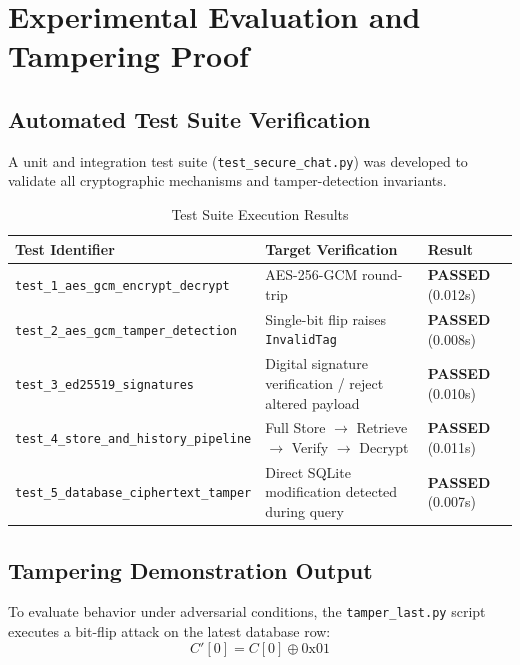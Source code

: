 \documentclass[11pt,a4paper]{article}
\begin{document}
\section{Experimental Evaluation and Tampering Proof}

\subsection{Automated Test Suite Verification}
A unit and integration test suite (\texttt{test\_secure\_chat.py}) was developed to validate all cryptographic mechanisms and tamper-detection invariants.

\begin{table}[htbp]
\centering
\small
\begin{tabular}{@{}lll@{}}
\toprule
\textbf{Test Identifier} & \textbf{Target Verification} & \textbf{Result} \\
\midrule
\texttt{test\_1\_aes\_gcm\_encrypt\_decrypt} & AES-256-GCM round-trip & \textbf{PASSED} (0.012s) \\
\texttt{test\_2\_aes\_gcm\_tamper\_detection} & Single-bit flip raises \texttt{InvalidTag} & \textbf{PASSED} (0.008s) \\
\texttt{test\_3\_ed25519\_signatures} & Digital signature verification / reject altered payload & \textbf{PASSED} (0.010s) \\
\texttt{test\_4\_store\_and\_history\_pipeline} & Full Store $\rightarrow$ Retrieve $\rightarrow$ Verify $\rightarrow$ Decrypt & \textbf{PASSED} (0.011s) \\
\texttt{test\_5\_database\_ciphertext\_tamper} & Direct SQLite modification detected during query & \textbf{PASSED} (0.007s) \\
\bottomrule
\end{tabular}
\caption{Test Suite Execution Results}
\label{tab:tests}
\end{table}

\subsection{Tampering Demonstration Output}
To evaluate behavior under adversarial conditions, the \texttt{tamper\_last.py} script executes a bit-flip attack on the latest database row:
\begin{equation}
C'[0] = C[0] \oplus 0\text{x}01
\end{equation}
\end{document}
